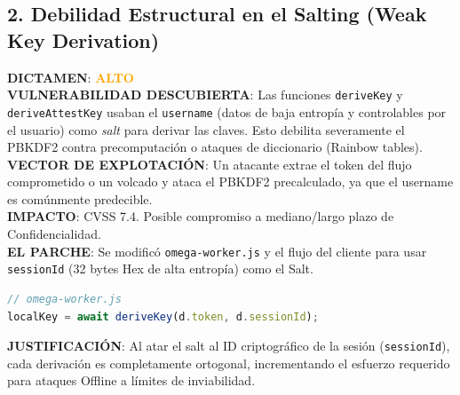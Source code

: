 \documentclass[12pt,a4paper]{article}
\begin{document}
\subsection{2. Debilidad Estructural en el Salting (Weak Key Derivation)}
\textbf{DICTAMEN}: \textcolor{orange}{\textbf{ALTO}}\\
\textbf{VULNERABILIDAD DESCUBIERTA}: Las funciones \texttt{deriveKey} y \texttt{deriveAttestKey} usaban el \texttt{username} (datos de baja entropía y controlables por el usuario) como \textit{salt} para derivar las claves. Esto debilita severamente el PBKDF2 contra precomputación o ataques de diccionario (Rainbow tables).\\
\textbf{VECTOR DE EXPLOTACIÓN}: Un atacante extrae el token del flujo comprometido o un volcado y ataca el PBKDF2 precalculado, ya que el username es comúnmente predecible.\\
\textbf{IMPACTO}: CVSS 7.4. Posible compromiso a mediano/largo plazo de Confidencialidad.\\
\textbf{EL PARCHE}: Se modificó \texttt{omega-worker.js} y el flujo del cliente para usar \texttt{sessionId} (32 bytes Hex de alta entropía) como el Salt.
\begin{lstlisting}[language=JavaScript]
// omega-worker.js
localKey = await deriveKey(d.token, d.sessionId);
\end{lstlisting}
\textbf{JUSTIFICACIÓN}: Al atar el salt al ID criptográfico de la sesión (\texttt{sessionId}), cada derivación es completamente ortogonal, incrementando el esfuerzo requerido para ataques Offline a límites de inviabilidad.
\end{document}
